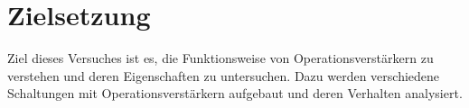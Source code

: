 \section{Zielsetzung}
\label{sec:Zielsetzung}
Ziel dieses Versuches ist es, die Funktionsweise von Operationsverstärkern zu verstehen
und deren Eigenschaften zu untersuchen. Dazu werden verschiedene Schaltungen mit Operationsverstärkern
aufgebaut und deren Verhalten analysiert.